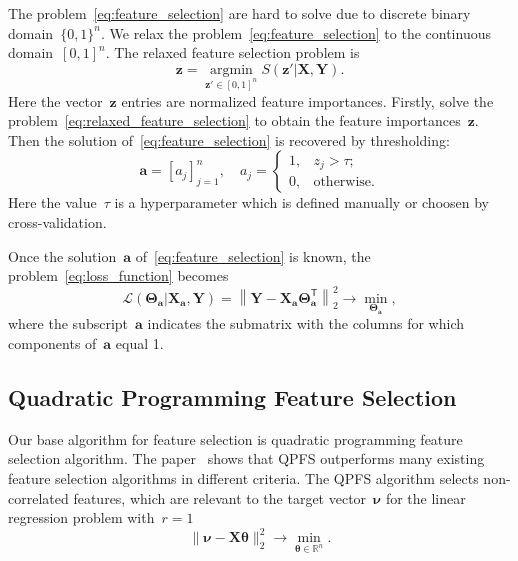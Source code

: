 \documentclass[12pt,twoside]{article}
\theoremstyle{definition}
\newcommand{\ba}{\mathbf{a}}
\newcommand{\bz}{\mathbf{z}}
\newcommand{\bY}{\mathbf{Y}}
\newcommand{\bX}{\mathbf{X}}
\newcommand{\bbR}{\mathbb{R}}
\newcommand{\T}{\mathsf{T}}
\newcommand{\bnu}{\boldsymbol{\nu}}
\newcommand{\btheta}{\boldsymbol{\theta}}
\newcommand{\bTheta}{\boldsymbol{\Theta}}
\newcommand{\argmin}{\mathop{\arg \min}\limits}
\begin{document}
The problem~\eqref{eq:feature_selection} are hard to solve due to discrete binary domain~$\{0, 1\}^n$. We relax the problem~\eqref{eq:feature_selection} to the continuous domain~$[0, 1]^n$. The relaxed feature selection problem is
\begin{equation}
\bz = \argmin_{\bz' \in [0, 1]^n} S(\bz' | \bX, \bY).
\label{eq:relaxed_feature_selection}
\end{equation}
Here the vector~$\bz$ entries are normalized feature importances.
Firstly, solve the problem~\eqref{eq:relaxed_feature_selection} to obtain the feature importances~$\bz$. 
Then the solution of~\eqref{eq:feature_selection} is recovered by thresholding:
\begin{equation*}
\ba = [a_j]_{j=1}^n, \quad 
a_j = \begin{cases}
1, & z_j > \tau; \\
0, & \text{otherwise}.
\end{cases}
\end{equation*}
Here the value~$\tau$ is a hyperparameter which is defined manually or choosen by cross-validation. 

Once the solution~$\ba$ of~\eqref{eq:feature_selection} is known, the problem~\eqref{eq:loss_function} becomes
\begin{equation*}
\mathcal{L}(\bTheta_{\ba} | \bX_{\ba}, \bY) = {\left\| \mathbf{Y} - \bX_{\ba}\bTheta^{\T}_{\ba} \right\| }_2^2 \rightarrow\min_{\bTheta_{\ba}},
\end{equation*}
where the subscript~$\ba$ indicates the submatrix with the columns for which components of~$\ba$ equal 1.

\subsection{Quadratic Programming Feature Selection}
Our base algorithm for feature selection is quadratic programming feature selection algorithm. 
The paper~\cite{katrutsa2017comprehensive} shows that QPFS outperforms many existing feature selection algorithms in different criteria.
The QPFS algorithm selects non-correlated features, which are relevant to the target vector~$\bnu$ for the linear regression problem with~$r=1$
\begin{equation*}
\| \bnu - \bX \btheta\|_2^2 \rightarrow\min_{\btheta \in \bbR^{n}}.
\end{equation*}
\end{document}
